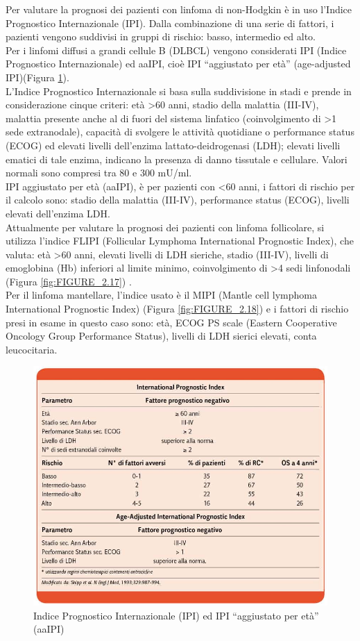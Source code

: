 Per valutare la prognosi dei pazienti con linfoma di non-Hodgkin è in uso l’Indice Prognostico Internazionale (IPI). 
Dalla combinazione di una serie di fattori, i pazienti vengono suddivisi in gruppi di rischio: basso, intermedio 
ed alto\cite{AIOM}.\\ 
Per i linfomi diffusi a grandi cellule B (DLBCL) vengono considerati IPI (Indice Prognostico Internazionale) ed aaIPI, 
cioè IPI “aggiustato per età” (age-adjusted IPI)(Figura \ref{fig:FIGURE_2.16}).\\
L’Indice Prognostico Internazionale si basa sulla suddivisione in stadi e prende in considerazione cinque criteri: 
età >60 anni, stadio della malattia (III-IV), malattia presente anche al di fuori del sistema linfatico 
(coinvolgimento di >1 sede extranodale), capacità di svolgere le attività quotidiane o performance status (ECOG)
ed elevati livelli dell’enzima lattato-deidrogenasi (LDH); elevati livelli ematici di tale enzima,
indicano la presenza di danno tissutale e cellulare. Valori normali sono compresi tra 80 e 300 mU/ml\cite{AIOM}.\\ 
IPI aggiustato per età (aaIPI), è per pazienti con <60 anni, i fattori di rischio per il calcolo sono: 
stadio della malattia (III-IV), performance status (ECOG), livelli elevati dell’enzima LDH.\\
Attualmente per valutare la prognosi dei pazienti con linfoma follicolare, si utilizza l’indice FLIPI 
(Follicular Lymphoma International Prognostic Index), che valuta: 
età >60 anni, elevati livelli di LDH sieriche, stadio (III-IV), livelli di emoglobina (Hb) inferiori al limite minimo, 
coinvolgimento di >4 sedi linfonodali (Figura \ref{fig:FIGURE_2.17}) \cite{AIOM}.\\
Per il linfoma mantellare, l’indice usato è il MIPI (Mantle cell lymphoma International Prognostic Index) 
(Figura \ref{fig:FIGURE_2.18}) e i fattori di rischio presi in esame in questo caso sono: età, ECOG PS scale 
(Eastern Cooperative Oncology Group Performance Status), livelli di LDH sierici elevati, conta leucocitaria\cite{MIPI}.

\begin{figure}[H]
    \begin{center}
    \includegraphics[width=0.5\columnwidth]{img/IPI-AAIPI.jpeg}
    \vspace{-3mm}
    \end{center}
    \caption{Indice Prognostico Internazionale (IPI) ed IPI “aggiustato per età” (aaIPI)
    \cite{img15-18}}
    \label{fig:FIGURE_2.16}
\end{figure}

